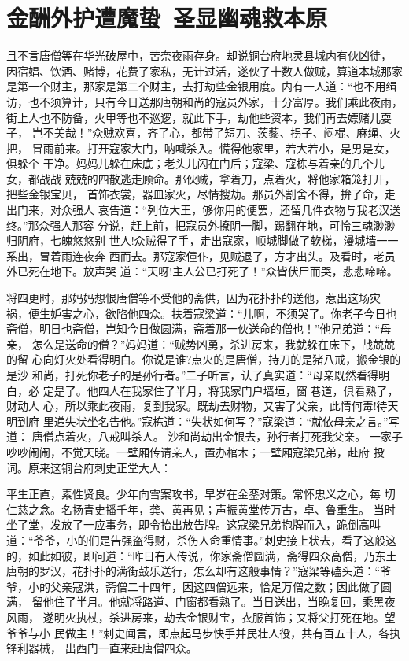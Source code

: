 \chapter{金酬外护遭魔蛰~圣显幽魂救本原}

且不言唐僧等在华光破屋中，苦奈夜雨存身。却说铜台府地灵县城内有伙凶徒，
因宿娼、饮酒、赌博，花费了家私，无计过活，遂伙了十数人做贼，算道本城那家
是第一个财主，那家是第二个财主，去打劫些金银用度。内有一人道：“也不用缉
访，也不须算计，只有今日送那唐朝和尚的寇员外家，十分富厚。我们乘此夜雨，
街上人也不防备，火甲等也不巡逻，就此下手，劫他些资本，我们再去嫖赌儿耍子，
岂不美哉！”众贼欢喜，齐了心，都带了短刀、蒺藜、拐子、闷棍、麻绳、火把，
冒雨前来。打开寇家大门，呐喊杀入。慌得他家里，若大若小，是男是女，俱躲个
干净。妈妈儿躲在床底；老头儿闪在门后；寇梁、寇栋与着亲的几个儿女，都战战
兢兢的四散逃走顾命。那伙贼，拿着刀，点着火，将他家箱笼打开，把些金银宝贝，
首饰衣裳，器皿家火，尽情搜劫。那员外割舍不得，拚了命，走出门来，对众强人
哀告道：“列位大王，够你用的便罢，还留几件衣物与我老汉送终。”那众强人那容
分说，赶上前，把寇员外撩阴一脚，踢翻在地，可怜三魂渺渺归阴府，七魄悠悠别
世人!众贼得了手，走出寇家，顺城脚做了软梯，漫城墙一一系出，冒着雨连夜奔
西而去。那寇家僮仆，见贼退了，方才出头。及看时，老员外已死在地下。放声哭
道：“天呀!主人公已打死了！”众皆伏尸而哭，悲悲啼啼。

将四更时，那妈妈想恨唐僧等不受他的斋供，因为花扑扑的送他，惹出这场灾
祸，便生妒害之心，欲陷他四众。扶着寇梁道：“儿啊，不须哭了。你老子今日也
斋僧，明日也斋僧，岂知今日做圆满，斋着那一伙送命的僧也！”他兄弟道：“母亲，
怎么是送命的僧？”妈妈道：“贼势凶勇，杀进房来，我就躲在床下，战兢兢的留
心向灯火处看得明白。你说是谁?点火的是唐僧，持刀的是猪八戒，搬金银的是沙
和尚，打死你老子的是孙行者。”二子听言，认了真实道：“母亲既然看得明白，必
定是了。他四人在我家住了半月，将我家门户墙垣，窗巷道，俱看熟了，财动人
心，所以乘此夜雨，复到我家。既劫去财物，又害了父亲，此情何毒!待天明到府
里递失状坐名告他。”寇栋道：“失状如何写？”寇梁道：“就依母亲之言。”写道：
唐僧点着火，八戒叫杀人。
沙和尚劫出金银去，孙行者打死我父亲。
一家子吵吵闹闹，不觉天晓。一壁厢传请亲人，置办棺木；一壁厢寇梁兄弟，赴府
投词。原来这铜台府刺史正堂大人：

平生正直，素性贤良。少年向雪案攻书，早岁在金銮对策。常怀忠义之心，每
切仁慈之念。名扬青史播千年，龚、黄再见；声振黄堂传万古，卓、鲁重生。
当时坐了堂，发放了一应事务，即令抬出放告牌。这寇梁兄弟抱牌而入，跪倒高叫
道：“爷爷，小的们是告强盗得财，杀伤人命重情事。”刺史接上状去，看了这般这
的，如此如彼，即问道：“昨日有人传说，你家斋僧圆满，斋得四众高僧，乃东土
唐朝的罗汉，花扑扑的满街鼓乐送行，怎么却有这般事情？”寇梁等磕头道：“爷
爷，小的父亲寇洪，斋僧二十四年，因这四僧远来，恰足万僧之数；因此做了圆满，
留他住了半月。他就将路道、门窗都看熟了。当日送出，当晚复回，乘黑夜风雨，
遂明火执杖，杀进房来，劫去金银财宝，衣服首饰；又将父打死在地。望爷爷与小
民做主！”刺史闻言，即点起马步快手并民壮人役，共有百五十人，各执锋利器械，
出西门一直来赶唐僧四众。

